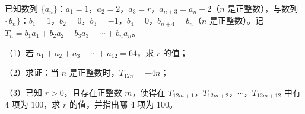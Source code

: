 \begin{question}
已知数列 $\{a_n\}$：$a_1=1$，$a_2=2$，$a_3=r$，$a_{n+3}=a_n+2$（$n$ 是正整数），与数列 $\{b_n\}$：$b_1=1$，$b_2=0$，$b_3=-1$，$b_4=0$，$b_{n+4}=b_n$（$n$ 是正整数）。记 $T_n=b_1a_1+b_2a_2+b_3a_3+\cdots+b_na_n$。

（1）若 $a_1+a_2+a_3+\cdots+a_{12}=64$，求 $r$ 的值；

（2）求证：当 $n$ 是正整数时，$T_{12n}=-4n$；

（3）已知 $r>0$，且存在正整数 $m$，使得在 $T_{12m+1}$，$T_{12m+2}$，$\cdots$，$T_{12m+12}$ 中有 $4$ 项为 $100$，求 $r$ 的值，并指出哪 $4$ 项为 $100$。

\end{question}